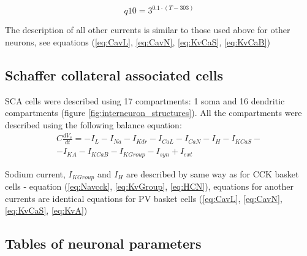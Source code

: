 \documentclass[a4paper,12pt]{article}
\begin{document}
\begin{equation}
q10 = 3^{0.1\cdot (T - 303) } 
\end{equation}

The description of all other currents is similar to those used above for other neurons, see equations (\ref{eq:CavL}, \ref{eq:CavN}, \ref{eq:KvCaS}, \ref{eq:KvCaB})

\subsection{Schaffer collateral associated cells}
SCA cells were described using 17 compartments: 1 soma and 16 dendritic compartments (figure \ref{fig:interneuron_structures}). All the compartments were described using the following balance equation:
\begin{eqnarray}
C\frac{dV_s}{dt}=-I_L-I_{Na}-I_{Kdr}-I_{CaL}-I_{CaN}-I_{H}-I_{KCaS}- \nonumber \\ -I_{KA}-I_{KCaB}-I_{KGroup}-I_{syn} + I_{ext}
\end{eqnarray}

Sodium current, $I_{KGroup}$ and $I_{H}$ are described by same way as for CCK basket cells - equation  (\ref{eq:Navcck}, \ref{eq:KvGroup}, \ref{eq:HCN}), equations for another currents are identical equations for PV basket cells  (\ref{eq:CavL}, \ref{eq:CavN}, \ref{eq:KvCaS}, \ref{eq:KvA})

\subsection{Tables of neuronal parameters} \label{tables_of_neurons}










\end{document}
